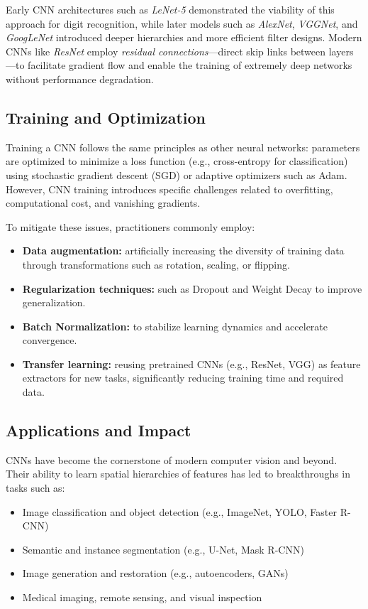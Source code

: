 \documentclass[12pt,a4paper]{report}
\begin{document}
\vspace{0.5em}
Early CNN architectures such as \textit{LeNet-5} demonstrated the viability of this approach for digit recognition, while later models such as \textit{AlexNet}, \textit{VGGNet}, and \textit{GoogLeNet} introduced deeper hierarchies and more efficient filter designs. 
Modern CNNs like \textit{ResNet} employ \textit{residual connections}—direct skip links between layers—to facilitate gradient flow and enable the training of extremely deep networks without performance degradation.

\vspace{1em}
\subsection{Training and Optimization}

Training a CNN follows the same principles as other neural networks: parameters are optimized to minimize a loss function (e.g., cross-entropy for classification) using stochastic gradient descent (SGD) or adaptive optimizers such as Adam. 
However, CNN training introduces specific challenges related to overfitting, computational cost, and vanishing gradients.

\vspace{0.5em}
To mitigate these issues, practitioners commonly employ:
\begin{itemize}
    \item \textbf{Data augmentation:} artificially increasing the diversity of training data through transformations such as rotation, scaling, or flipping.
    \item \textbf{Regularization techniques:} such as Dropout and Weight Decay to improve generalization.
    \item \textbf{Batch Normalization:} to stabilize learning dynamics and accelerate convergence.
    \item \textbf{Transfer learning:} reusing pretrained CNNs (e.g., ResNet, VGG) as feature extractors for new tasks, significantly reducing training time and required data.
\end{itemize}

\vspace{1em}
\subsection{Applications and Impact}

CNNs have become the cornerstone of modern computer vision and beyond. 
Their ability to learn spatial hierarchies of features has led to breakthroughs in tasks such as:
\begin{itemize}
    \item Image classification and object detection (e.g., ImageNet, YOLO, Faster R-CNN)
    \item Semantic and instance segmentation (e.g., U-Net, Mask R-CNN)
    \item Image generation and restoration (e.g., autoencoders, GANs)
    \item Medical imaging, remote sensing, and visual inspection
\end{itemize}
\end{document}
